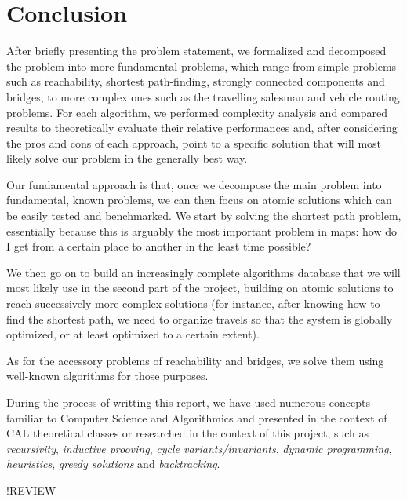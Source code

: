 \chapter{Conclusion} \label{conclusion}
After briefly presenting the problem statement, we formalized and decomposed the problem into more fundamental problems, which range from simple problems such as reachability, shortest path-finding, strongly connected components and bridges, to more complex ones such as the travelling salesman and vehicle routing problems. For each algorithm, we performed complexity analysis and compared results to theoretically evaluate their relative performances and, after considering the pros and cons of each approach, point to a specific solution that will most likely solve our problem in the generally best way.\par
Our fundamental approach is that, once we decompose the main problem into fundamental, known problems, we can then focus on atomic solutions which can be easily tested and benchmarked. We start by solving the shortest path problem, essentially because this is arguably the most important problem in maps: how do I get from a certain place to another in the least time possible?\par
We then go on to build an increasingly complete algorithms database that we will most likely use in the second part of the project, building on atomic solutions to reach successively more complex solutions (for instance, after knowing how to find the shortest path, we need to organize travels so that the system is globally optimized, or at least optimized to a certain extent).\par
As for the accessory problems of reachability and bridges, we solve them using well-known algorithms for those purposes.\par
During the process of writting this report, we have used numerous concepts familiar to Computer Science and Algorithmics and presented in the context of CAL theoretical classes or researched in the context of this project, such as \emph{recursivity}, \emph{inductive prooving}, \emph{cycle variants/invariants}, \emph{dynamic programming}, \emph{heuristics}, \emph{greedy solutions} and \emph{backtracking}.\par
!REVIEW
